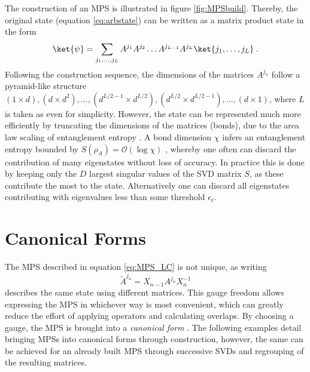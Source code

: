 The construction of an MPS is illustrated in figure \ref{fig:MPSbuild}. Thereby, the original state (equation \ref{eq:arbstate}) can be written as a matrix product state in the form \cite{schollwock}
\begin{equation}
	\ket{\psi} = \sum_{j_1, \ldots, j_L} A^{j_1} A^{j_2} \ldots A^{j_{L-1}} A^{j_{L}} \ket{j_1, \ldots, j_L} \; .
	\label{eq:MPS_LC} 
\end{equation}
Following the construction sequence, the dimensions of the matrices $A^{j_n}$ follow a pyramid-like structure $(1 \times d ),(d \times d^2) , \ldots , (d^{L/2 -1} \times d^{L/2}) , (d^{L/2} \times d^{L/2 -1 }), \ldots , (d \times 1)$, where $L$ is taken as even for simplicity. 
However, the state can be represented much more efficiently by truncating the dimensions of the matrices (bonds), due to the area law scaling of entanglement entropy \cite{EntropyScaling}. A bond dimension $\chi$ infers an entanglement entropy bounded by $S(\rho_A) = \mathcal{O}(\log \chi)$ \cite{Gillman2018}, whereby one often can discard the contribution of many eigenstates without loss of accuracy. In practice this is done by keeping only the $D$ largest singular values of the SVD matrix $S$, as these contribute the most to the state. Alternatively  one can discard all eigenstates contributing with eigenvalues less than some threshold $\epsilon_t$.


\section{Canonical Forms}
\label{sec:canonical}
The MPS described in equation \ref{eq:MPS_LC} is not unique, as writing 
\begin{equation}
	\tilde{A}^{j_n} = X_{n-1} A^{j_n} X_{n}^{-1}
\end{equation}
describes the same state using different matrices. This gauge freedom allows expressing the MPS in whichever way is most convenient, which can greatly reduce the effort of applying operators and calculating overlaps. By choosing a gauge, the MPS is brought into a \textit{canonical form} \cite{Vidal2007}. The following examples detail bringing MPSs into canonical forms through construction, however, the same can be achieved for an already built MPS through successive SVDs and regrouping of the resulting matrices. 

